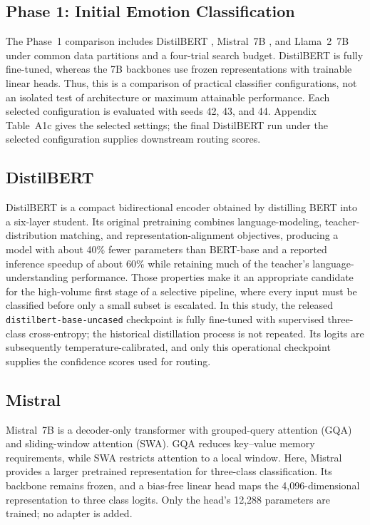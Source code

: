 \documentclass{ieeeaccess}
\begin{document}
\subsection{Phase 1: Initial Emotion Classification}

The Phase~1 comparison includes DistilBERT \cite{ref12}, Mistral~7B \cite{ref13}, and Llama~2~7B \cite{ref14} under common data partitions and a four-trial search budget. DistilBERT is fully fine-tuned, whereas the 7B backbones use frozen representations with trainable linear heads. Thus, this is a comparison of practical classifier configurations, not an isolated test of architecture or maximum attainable performance. Each selected configuration is evaluated with seeds 42, 43, and 44. Appendix Table~A1c gives the selected settings; the final DistilBERT run under the selected configuration supplies downstream routing scores.

\subsection{DistilBERT}

DistilBERT \cite{ref12} is a compact bidirectional encoder obtained by distilling BERT into a six-layer student. Its original pretraining combines language-modeling, teacher-distribution matching, and representation-alignment objectives, producing a model with about 40\% fewer parameters than BERT-base and a reported inference speedup of about 60\% while retaining much of the teacher's language-understanding performance. Those properties make it an appropriate candidate for the high-volume first stage of a selective pipeline, where every input must be classified before only a small subset is escalated. In this study, the released \texttt{distilbert-base-uncased} checkpoint is fully fine-tuned with supervised three-class cross-entropy; the historical distillation process is not repeated. Its logits are subsequently temperature-calibrated, and only this operational checkpoint supplies the confidence scores used for routing.

\subsection{Mistral}

Mistral~7B \cite{ref13} is a decoder-only transformer with grouped-query attention (GQA) and sliding-window attention (SWA). GQA reduces key--value memory requirements, while SWA restricts attention to a local window. Here, Mistral provides a larger pretrained representation for three-class classification. Its backbone remains frozen, and a bias-free linear head maps the 4,096-dimensional representation to three class logits. Only the head's 12,288 parameters are trained; no adapter is added.
\end{document}
